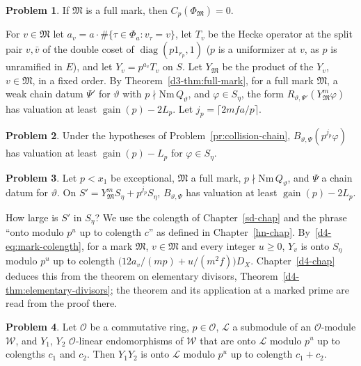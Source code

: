\documentclass[reqno]{amsart}
\newcounter{chap}
\theoremstyle{definition}
\newtheorem{problem}{Problem}[section]
\theoremstyle{plain}
\theoremstyle{definition}
\theoremstyle{remark}
\newcommand{\Oc}{\mathcal O}
\newcommand{\gain}{\operatorname{gain}}
\newcommand{\Nm}{\mathrm{Nm}\,}
\newcommand{\Mk}{\mathfrak M}
\begin{document}
\begin{problem}\label{pr:full-mark}
If \(\Mk\) is a full mark, then \(C_p(\Phi_{\Mk}) = 0\).
\end{problem}

For \(v \in \Mk\) let \(a_v = a \cdot \#\{\tau \in \Phi_a : v_\tau = v\}\), let \(T_v\) be the Hecke operator at the split pair \(v, \bar v\) of the double coset of \(\operatorname{diag}(p 1_{r_p}, 1)\) (\(p\) is a uniformizer at \(v\), as \(p\) is unramified in \(E\)), and let \(Y_v = p^{a_v} T_v\) on \(S\).  Let \(Y_{\Mk}\) be the product of the \(Y_v\), \(v \in \Mk\), in a fixed order.  By Theorem~\ref{d3-thm:full-mark}, for a full mark \(\Mk\), a weak chain datum \(\Psi'\) for \(\vartheta\) with \(p \nmid \Nm Q_\vartheta\), and \(\varphi \in S_\eta\), the form \(R_{\vartheta,\Psi'}(Y_{\Mk}^m\varphi)\) has valuation at least \(\gain(p) - 2L_p\).  Let \(j_p = \lceil 2mfa/p \rceil\).

\begin{problem}\label{pr:crude}
Under the hypotheses of Problem~\ref{pr:collision-chain}, \(B_{\vartheta,\Psi}(p^{j_p}\varphi)\) has valuation at least \(\gain(p) - L_p\) for \(\varphi \in S_\eta\).
\end{problem}

\begin{problem}\label{pr:two-pieces}
Let \(p < x_1\) be exceptional, \(\Mk\) a full mark, \(p \nmid \Nm Q_\vartheta\), and \(\Psi\) a chain datum for \(\vartheta\).  On \(S' = Y_{\Mk}^m S_\eta + p^{j_p} S_\eta\), \(B_{\vartheta,\Psi}\) has valuation at least \(\gain(p) - 2L_p\).
\end{problem}

How large is \(S'\) in \(S_\eta\)?  We use the colength of Chapter~\ref{sd-chap} and the phrase ``onto modulo \(p^u\) up to colength \(c\)'' as defined in Chapter~\ref{hn-chap}.  By~\eqref{d4-eq:mark-colength}, for a mark \(\Mk\), \(v \in \Mk\) and every integer \(u \ge 0\), \(Y_v\) is onto \(S_\eta\) modulo \(p^u\) up to colength \(\bigl(12a_v/(mp) + u/(m^2 f)\bigr) D_X\).  Chapter~\ref{d4-chap} deduces this from the theorem on elementary divisors, Theorem~\ref{d4-thm:elementary-divisors}; the theorem and its application at a marked prime are read from the proof there.

\begin{problem}\label{pr:colength-add}
Let \(\Oc\) be a commutative ring, \(p \in \Oc\), \(\mathcal L\) a submodule of an \(\Oc\)-module \(\mathcal W\), and \(Y_1\), \(Y_2\) \(\Oc\)-linear endomorphisms of \(\mathcal W\) that are onto \(\mathcal L\) modulo \(p^u\) up to colengths \(c_1\) and \(c_2\).  Then \(Y_1Y_2\) is onto \(\mathcal L\) modulo \(p^u\) up to colength \(c_1 + c_2\).
\end{problem}
\end{document}
